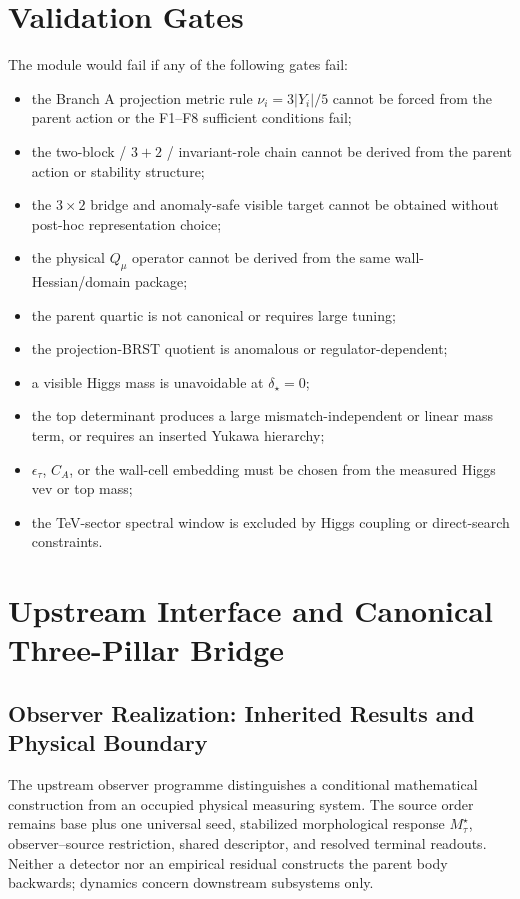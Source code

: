 \documentclass[11pt]{article}
\begin{document}
\section{Validation Gates}
The module would fail if any of the following gates fail:
\begin{itemize}
\item the Branch A projection metric rule $\nu_i=3|Y_i|/5$ cannot be forced from the parent action or the F1--F8 sufficient conditions fail;
\item the two-block / $3+2$ / invariant-role chain cannot be derived from the parent action or stability structure;
\item the $3\times2$ bridge and anomaly-safe visible target cannot be obtained without post-hoc representation choice;
\item the physical $Q_\mu$ operator cannot be derived from the same wall-Hessian/domain package;
\item the parent quartic is not canonical or requires large tuning;
\item the projection-BRST quotient is anomalous or regulator-dependent;
\item a visible Higgs mass is unavoidable at $\delta_\star=0$;
\item the top determinant produces a large mismatch-independent or linear mass term, or requires an inserted Yukawa hierarchy;
\item $\epsilon_\tau$, $C_A$, or the wall-cell embedding must be chosen from
the measured Higgs vev or top mass;
\item the TeV-sector spectral window is excluded by Higgs coupling or direct-search constraints.
\end{itemize}

\section{Upstream Interface and Canonical Three-Pillar Bridge}
\label{sec:upstream-interface}

\subsection{Observer Realization: Inherited Results and Physical Boundary}
\label{sec:observer-update-20260914}
The upstream observer programme distinguishes a conditional mathematical
construction from an occupied physical measuring system. The source order
remains base plus one universal seed, stabilized morphological response
$M_\tau^\star$, observer--source restriction, shared descriptor, and resolved
terminal readouts. Neither a detector nor an empirical residual constructs the
parent body backwards; dynamics concern downstream subsystems only.
\end{document}
